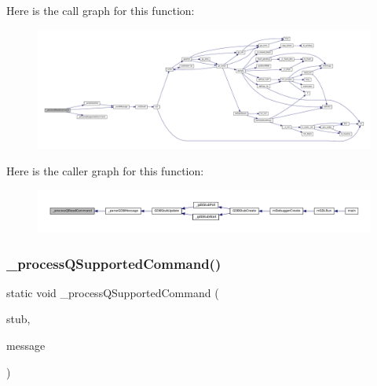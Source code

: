 Here is the call graph for this function\+:
\nopagebreak
\begin{figure}[H]
\begin{center}
\leavevmode
\includegraphics[width=350pt]{gdb-stub_8c_ab15c73fbee09b784e5989c520d65c002_cgraph}
\end{center}
\end{figure}
Here is the caller graph for this function\+:
\nopagebreak
\begin{figure}[H]
\begin{center}
\leavevmode
\includegraphics[width=350pt]{gdb-stub_8c_ab15c73fbee09b784e5989c520d65c002_icgraph}
\end{center}
\end{figure}
\mbox{\label{gdb-stub_8c_aa885c9605db7de6ec89abaf7c094c61f}} 
\subsubsection{\texorpdfstring{\+\_\+process\+Q\+Supported\+Command()}{\_processQSupportedCommand()}}
{\footnotesize\ttfamily static void \+\_\+process\+Q\+Supported\+Command (\begin{DoxyParamCaption}\item[{struct G\+D\+B\+Stub $\ast$}]{stub,  }\item[{const char $\ast$}]{message }\end{DoxyParamCaption})\hspace{0.3cm}{\ttfamily [static]}}


